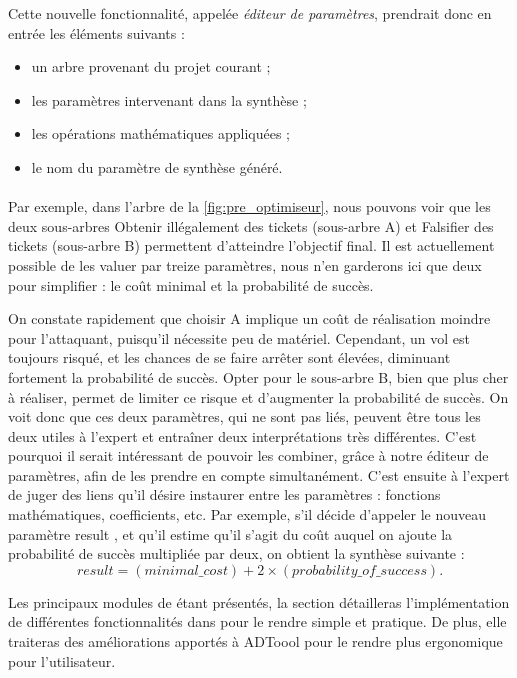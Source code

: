			Cette nouvelle fonctionnalité, appelée \emph{éditeur de paramètres}, prendrait donc en entrée les éléments suivants :
			\begin{itemize}
				\item un arbre provenant du projet courant ;
				\item les paramètres intervenant dans la synthèse ;
				\item les opérations mathématiques appliquées ;
				\item le nom du paramètre de synthèse généré.
			\end{itemize}

			\paragraph{}
			Par exemple, dans l'arbre de la {} \ref{fig:pre_optimiseur}, nous pouvons voir que les deux sous-arbres \og Obtenir illégalement des tickets \fg{} (sous-arbre A) et \og Falsifier des tickets \fg{} (sous-arbre B) permettent d'atteindre l'objectif final. Il est actuellement possible de les valuer par treize paramètres, nous n'en garderons ici que deux pour simplifier : le coût minimal et la probabilité de succès.

			On constate rapidement que choisir A implique un coût de réalisation moindre pour l'attaquant, puisqu'il nécessite peu de matériel. Cependant, un vol est toujours risqué, et les chances de se faire arrêter sont élevées, diminuant fortement la probabilité de succès. Opter pour le sous-arbre B, bien que plus cher à réaliser, permet de limiter ce risque et d'augmenter la probabilité de succès. On voit donc que ces deux paramètres, qui ne sont pas liés, peuvent être tous les deux utiles à l'expert et entraîner deux interprétations très différentes. C'est pourquoi il serait intéressant de pouvoir les combiner, grâce à notre éditeur de paramètres, afin de les prendre en compte simultanément. C'est ensuite à l'expert de juger des liens qu'il désire instaurer entre les paramètres : fonctions mathématiques, coefficients, etc. Par exemple, s'il décide d'appeler le nouveau paramètre \og result \fg{}, et qu'il estime qu'il s'agit du coût auquel on ajoute la probabilité de succès multipliée par deux, on obtient la synthèse suivante : \[ result = (minimal\_cost) + 2 \times (probability\_of\_success).\]

			Les principaux modules de \glasir étant présentés, la section détailleras l'implémentation de différentes fonctionnalités dans \glasir{} pour le rendre simple et pratique. De plus, elle traiteras des améliorations apportés à ADToool pour le rendre plus ergonomique pour l'utilisateur.